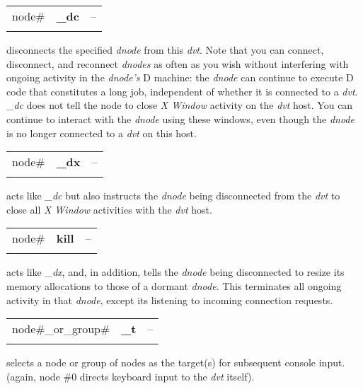 \begin{tabular}{>{\sffamily}r>{\sffamily\bfseries}l>{\sffamily}l}
node\# & \_dc & --\\\\
\end{tabular}

\noindent disconnects the specified \emph{dnode} from this \emph{dvt}. Note that you can connect, disconnect, and reconnect \emph{dnodes} as often as you wish without interfering with ongoing activity in the \emph{dnode's} D machine: the \emph{dnode} can continue to execute D code that constitutes a long job, independent of whether it is connected to a \emph{dvt}. \emph{\_dc} does not tell the node to close \emph{X Window} activity on the \emph{dvt} host. You can continue to interact with the \emph{dnode} using these windows, even though the \emph{dnode} is no longer connected to a \emph{dvt} on this host.\\

\begin{tabular}{>{\sffamily}r>{\sffamily\bfseries}l>{\sffamily}l}
node\# & \_dx & --\\\\
\end{tabular}

\noindent acts like \emph{\_dc} but also instructs the \emph{dnode} being disconnected from the \emph{dvt} to close all \emph{X Window} activities with the \emph{dvt} host.\\

\begin{tabular}{>{\sffamily}r>{\sffamily\bfseries}l>{\sffamily}l}
node\# & kill & --\\\\
\end{tabular}

\noindent acts like \emph{\_dx}, and, in addition, tells the \emph{dnode} being disconnected to resize its memory allocations to those of a dormant \emph{dnode}. This terminates all ongoing activity in that \emph{dnode}, except its listening to incoming connection requests.\\

\begin{tabular}{>{\sffamily}r>{\sffamily\bfseries}l>{\sffamily}l}
node\#\_or\_group\# & \_t & --\\\\
\end{tabular} 
 
\noindent selects a node or group of nodes as the target(s) for subsequent console input. (again, node \#$0$ directs keyboard input to the \emph{dvt} itself).\\

